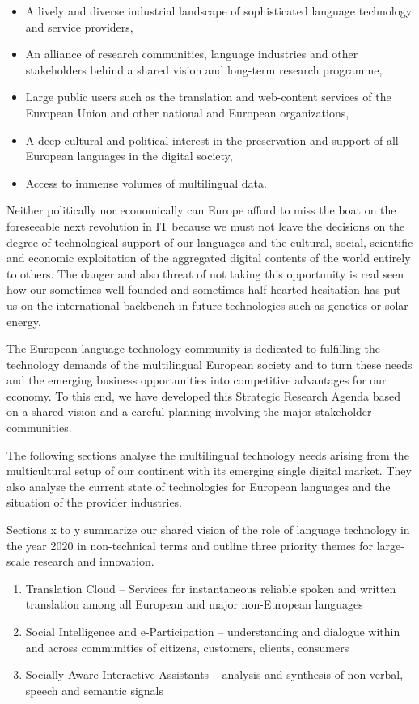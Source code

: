 \documentclass[10pt, plain]{../../metanetpaper}
\begin{document}
\begin{multicols}{2}
\begin{itemize}
\item A lively and diverse industrial landscape of sophisticated language technology and service providers,
\item An alliance of research communities, language industries and other stakeholders behind a shared vision and long-term research programme,
\item Large public users such as the translation and web-content services of the European Union and other national and European organizations,
\item A deep cultural and political interest in the preservation and support of all European languages in the digital society,
\item Access to immense volumes of multilingual data.
\end{itemize}

Neither politically nor economically can Europe afford to miss the boat on the foreseeable next revolution in IT because we must not leave the decisions on the degree of technological support of our languages and the cultural, social, scientific and economic exploitation of the aggregated digital contents of the world entirely to others. The danger and also threat of not taking this opportunity is real seen how our sometimes well-founded and sometimes half-hearted hesitation has put us on the international backbench in future technologies such as genetics or solar energy.

The European language technology community is dedicated to fulfilling the technology demands of the multilingual European society and to turn these needs and the emerging business opportunities into competitive advantages for our economy. To this end, we have developed this Strategic Research Agenda based on a shared vision and a careful planning involving the major stakeholder communities.

The following sections analyse the multilingual technology needs arising from the multicultural setup of our continent with its emerging single digital market. They also analyse the current state of technologies for European languages and the situation of the provider industries. 

Sections x to y summarize our shared vision of the role of language technology in the year 2020 in non-technical terms and outline three priority themes for large-scale research and innovation. 

\begin{enumerate}
\item Translation Cloud – Services for instantaneous reliable spoken and written translation among all European and major non-European languages
\item Social Intelligence and e-Participation – understanding and dialogue within and across communities of citizens, customers, clients, consumers
\item Socially Aware Interactive Assistants – analysis and synthesis of non-verbal, speech and semantic signals
\end{enumerate}
 

\end{multicols}
\end{document}

